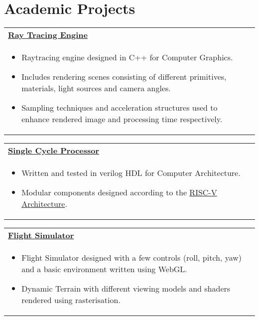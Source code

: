 \documentclass[a4paper,8pt]{article}
\begin{document}
\section{\textbf{Academic Projects}}
\begin{tabularx}{\linewidth}{ @{}l r@{} }
\textbf{\href{https://github.com/aliasgharchakera/raytracer}{Ray Tracing Engine}} \\[4pt]
\begin{minipage}[t]{\linewidth}
    \begin{itemize}[nosep,after=\strut, leftmargin=1em, itemsep=2pt] 
        \item Raytracing engine designed in C++ for Computer Graphics.
        \item Includes rendering scenes consisting of different primitives, materials, light sources and camera angles.
        \item Sampling techniques and acceleration structures used to enhance rendered image and processing time respectively.
    \end{itemize}
\end{minipage}
\end{tabularx}

\begin{tabularx}{\linewidth}{ @{}l r@{} }
\textbf{\href{https://github.com/Mustafasohail7/single_cycle_processor}{Single Cycle Processor}} \\[4pt]
\begin{minipage}[t]{\linewidth}
    \begin{itemize}[nosep,after=\strut, leftmargin=1em, itemsep=2pt] 
        \item Written and tested in verilog HDL for Computer Architecture.
        \item Modular components designed according to the \href{https://github.com/Mustafasohail7/CA_Labs/assets/66203849/f3fc6bbe-66f0-498a-8ebf-cc1a026871b2}{RISC-V Architecture}.
    \end{itemize}
\end{minipage}
\end{tabularx}

\begin{tabularx}{\linewidth}{ @{}l r@{} }
\textbf{\href{https://github.com/aliasgharchakera/flight-simulator}{Flight Simulator}} \\[4pt]
\begin{minipage}[t]{\linewidth}
    \begin{itemize}[nosep,after=\strut, leftmargin=1em, itemsep=2pt] 
        \item Flight Simulator designed with a few controls (roll, pitch, yaw) and a basic environment written using WebGL.
        \item Dynamic Terrain with different viewing models and shaders rendered using rasterisation.
    \end{itemize}
\end{minipage}
\end{tabularx}
\end{document}
